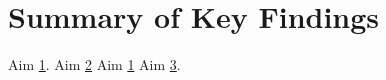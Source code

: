 \documentclass[../Dissertation]{subfiles}
\begin{document}
\section{Summary of Key Findings}\label{abstract_5}
    \lipsum[64] Aim \hyperref[aim:1]{1}.  \lipsum[64] Aim \hyperref[aim:2]{2}
    \lipsum[64] Aim \hyperref[aim:1]{1} \lipsum[64] Aim \hyperref[aim:3]{3}.
\end{document}
